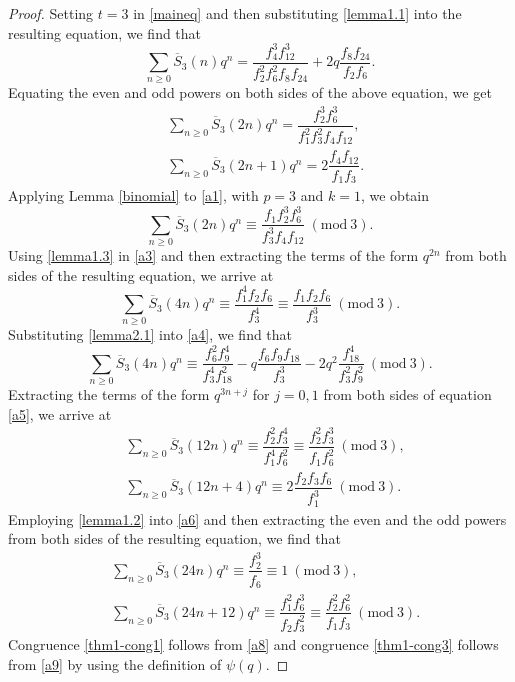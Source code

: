 \documentclass[12pt]{amsart}
\theoremstyle{plain}
\theoremstyle{definition}
\begin{document}
\begin{proof} Setting $t=3$ in \eqref{maineq} and then substituting \eqref{lemma1.1} into the resulting equation, we find that
\[
\sum_{n \geq 0} \overline{S}_{3}(n) q^{n} = \dfrac{f_{4}^{3} f_{12}^{3}}{f_{2}^{2} f_{6}^{2} f_{8} f_{24}} + 2q \dfrac{f_{8} f_{24}}{f_{2} f_{6}}.
\]
Equating the even and odd powers on both sides of the above equation, we get
\begin{align}
&\sum_{n \geq 0} \overline{S}_{3}(2n) q^{n} = \dfrac{f_{2}^{3} f_{6}^{3}}{f_{1}^{2} f_{3}^{2} f_{4} f_{12}}, \label{a1}\\
&\sum_{n \geq 0} \overline{S}_{3}(2n+1) q^{n} = 2\dfrac{f_{4} f_{12}}{f_{1} f_{3}}. \label{a2}
\end{align}
Applying Lemma \ref{binomial} to \eqref{a1}, with $p=3$ and $k=1$, we obtain
\begin{equation}
\sum_{n \geq 0} \overline{S}_{3}(2n) q^{n} \equiv  \dfrac{f_{1} f_{2}^{3} f_{6}^{3}} {f_{3}^{3} f_{4} f_{12}} \ (\mathrm{mod} \ 3). \label{a3}
\end{equation}
Using \eqref{lemma1.3} in \eqref{a3} and then extracting the terms of the form $q^{2n}$ from both sides of the resulting equation, we arrive at
\begin{equation}
\sum_{n \geq 0} \overline{S}_{3}(4n) q^{n} \equiv  \dfrac{f_{1}^{4} f_{2} f_{6}} {f_{3}^{4}} \equiv \dfrac{f_{1} f_{2} f_{6}} {f_{3}^{3}}  \ (\mathrm{mod} \ 3). \label{a4}
\end{equation}
Substituting \eqref{lemma2.1} into \eqref{a4}, we find that
\begin{equation}
\sum_{n \geq 0} \overline{S}_{3}(4n) q^{n} \equiv  \dfrac{f_{6}^{2} f_{9}^{4}} {f_{3}^{4} f_{18}^{2}} - q \dfrac{f_{6} f_ {9} f_{18}}{f_{3}^{3}} -2q^{2} \dfrac{f_{18}^{4}}{f_{3}^{2} f_{9}^{2}}  \ (\mathrm{mod} \ 3). \label{a5}
\end{equation}
Extracting the terms of the form $q^{3n+j}$ for $j=0,1$  from both sides of equation \eqref{a5}, we arrive at
\begin{align}
&\sum_{n \geq 0} \overline{S}_{3}(12n) q^{n} \equiv  \dfrac{f_{2}^{2} f_{3}^{4}} {f_{1}^{4} f_{6}^{2}} \equiv \dfrac{f_{2}^{2} f_{3}^{3}} {f_{1} f_{6}^{2}}   \ (\mathrm{mod} \ 3), \label{a6}\\
&\sum_{n \geq 0} \overline{S}_{3}(12n+4) q^{n} \equiv  2 \dfrac{f_{2} f_ {3} f_{6}}{f_{1}^{3}}  \ (\mathrm{mod} \ 3). \label{a7}
\end{align}
Employing \eqref{lemma1.2} into \eqref{a6} and then extracting the even and the odd powers from both sides of the resulting equation, we find that
\begin{align}
&\sum_{n \geq 0} \overline{S}_{3}(24n) q^{n} \equiv  \dfrac{f_{2}^{3}} {f_{6}} \equiv 1 \ (\mathrm{mod} \ 3), \label{a8}\\
&\sum_{n \geq 0} \overline{S}_{3}(24n+12) q^{n} \equiv   \dfrac{f_{1}^{2} f_ {6}^{3}}{f_{2} f_  {3}^{2}} \equiv \dfrac{f_{2}^{2} f_ {6}^{2}}{f_{1} f_{3}}  \ (\mathrm{mod} \ 3). \label{a9}
\end{align}
Congruence \eqref{thm1-cong1} follows from \eqref{a8} and congruence \eqref{thm1-cong3} follows from \eqref{a9} by using the definition of $\psi(q)$.


\end{proof}
\end{document}
